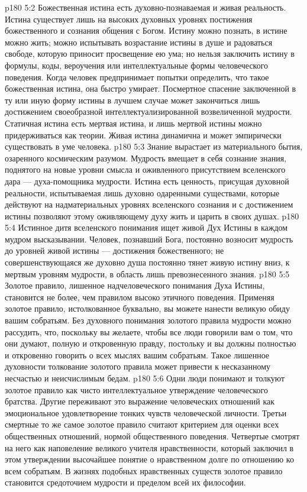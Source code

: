 \vs p180 5:2 Божественная истина есть духовно\hyp{}познаваемая и живая реальность. Истина существует лишь на высоких духовных уровнях постижения божественного и сознания общения с Богом. Истину можно познать, в истине можно жить; можно испытывать возрастание истины в душе и радоваться свободе, которую приносит просвещение ею ума; но нельзя заключить истину в формулы, коды, вероучения или интеллектуальные формы человеческого поведения. Когда человек предпринимает попытки определить, что такое божественная истина, она быстро умирает. Посмертное спасение заключенной в ту или иную форму истины в лучшем случае может закончиться лишь достижением своеобразной интеллектуализированной возвеличенной мудрости. Статичная истина есть мертвая истина, и лишь мертвой истины можно придерживаться как теории. Живая истина динамична и может эмпирически существовать в уме человека.
\vs p180 5:3 Знание вырастает из материального бытия, озаренного космическим разумом. Мудрость вмещает в себя сознание знания, поднятого на новые уровни смысла и оживленного присутствием вселенского дара --- духа\hyp{}помощника мудрости. Истина есть ценность, присущая духовной реальности, испытываемая лишь духовно одаренными существами, которые действуют на надматериальных уровнях вселенского сознания и с достижением истины позволяют этому оживляющему духу жить и царить в своих душах.
\vs p180 5:4 Истинное дитя вселенского понимания ищет живой Дух Истины в каждом мудром высказывании. Человек, познавший Бога, постоянно возносит мудрость до уровней живой истины --- достижения божественного; не совершенствующаяся же духовно душа постоянно тянет живую истину вниз, к мертвым уровням мудрости, в область лишь превознесенного знания.
\vs p180 5:5 Золотое правило, лишенное надчеловеческого понимания Духа Истины, становится не более, чем правилом высоко этичного поведения. Применяя золотое правило, истолкованное буквально, вы можете нанести великую обиду вашим собратьям. Без духовного понимания золотого правила мудрости можно рассудить, что, поскольку вы желаете, чтобы все люди говорили вам о том, что они думают, полную и откровенную правду, постольку и вы должны полностью и откровенно говорить о всех мыслях вашим собратьям. Такое лишенное духовности толкование золотого правила может привести к несказанному несчастью и неисчислимым бедам.
\vs p180 5:6 Одни люди понимают и толкуют золотое правило как чисто интеллектуальное утверждение человеческого братства. Другие переживают это выражение человеческих отношений как эмоциональное удовлетворение тонких чувств человеческой личности. Третьи смертные то же самое золотое правило считают критерием для оценки всех общественных отношений, нормой общественного поведения. Четвертые смотрят на него как наповеление великого учителя нравственности, который заключил в этом утверждении высочайшее понятие о нравственном долге по отношению ко всем собратьям. В жизнях подобных нравственных существ золотое правило становится средоточием мудрости и пределом всей их философии.
